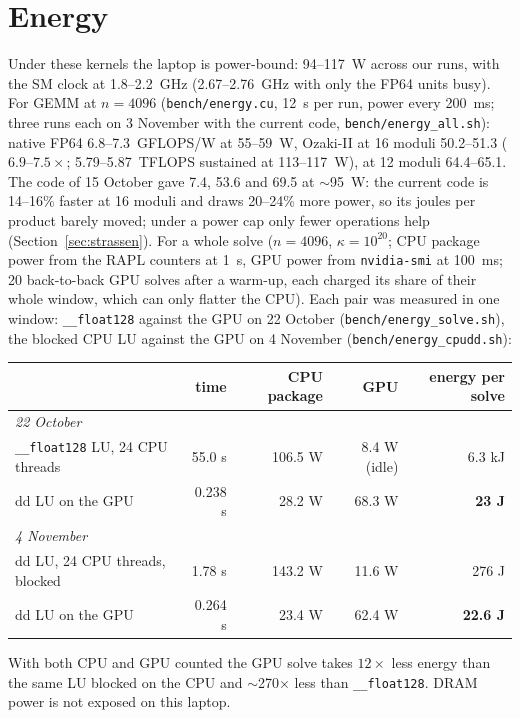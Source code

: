 \documentclass[11pt]{article}
\begin{document}
\section{Energy}\label{sec:energy}
Under these kernels the laptop is power-bound: 94--117~W across our runs, with the SM clock at 1.8--2.2~GHz (2.67--2.76~GHz
with only the FP64 units busy). For GEMM at $n=4096$ (\texttt{bench/energy.cu}, 12~s per run, power every 200~ms; three
runs each on 3 November with the current code, \texttt{bench/energy\_all.sh}): native FP64 6.8--7.3~GFLOPS/W at 55--59~W,
Ozaki-II at 16 moduli 50.2--51.3 ($6.9$--$7.5\times$; 5.79--5.87~TFLOPS sustained at 113--117~W), at 12 moduli 64.4--65.1. The
code of 15 October gave 7.4, 53.6 and 69.5 at $\sim$95~W: the current code is 14--16\% faster at 16 moduli and draws
20--24\% more power, so its joules per product barely moved; under a power cap only fewer operations help
(Section~\ref{sec:strassen}). For a whole solve ($n=4096$, $\kappa=10^{20}$; CPU package power from the RAPL counters at 1~s, GPU power from
\texttt{nvidia-smi} at 100~ms; 20 back-to-back GPU solves after a warm-up, each charged its share of their whole window,
which can only flatter the CPU). Each pair was measured in one window: \texttt{\_\_float128} against the GPU on 22 October
(\texttt{bench/energy\_solve.sh}), the blocked CPU LU against the GPU on 4 November (\texttt{bench/energy\_cpudd.sh}):
\begin{center}\begin{tabular}{lrrrr}\toprule
& time & CPU package & GPU & energy per solve \\\midrule
\multicolumn{5}{l}{\emph{22 October}} \\
\texttt{\_\_float128} LU, 24 CPU threads & 55.0 s & 106.5 W & 8.4 W (idle) & 6.3 kJ \\
dd LU on the GPU & 0.238 s & 28.2 W & 68.3 W & \textbf{23 J} \\\midrule
\multicolumn{5}{l}{\emph{4 November}} \\
dd LU, 24 CPU threads, blocked & 1.78 s & 143.2 W & 11.6 W & 276 J \\
dd LU on the GPU & 0.264 s & 23.4 W & 62.4 W & \textbf{22.6 J} \\\bottomrule
\end{tabular}\end{center}
With both CPU and GPU counted the GPU solve takes $12\times$ less energy than the same LU blocked on the CPU and $\sim$270$\times$
less than \texttt{\_\_float128}.
DRAM power is not exposed on this laptop.
\end{document}
